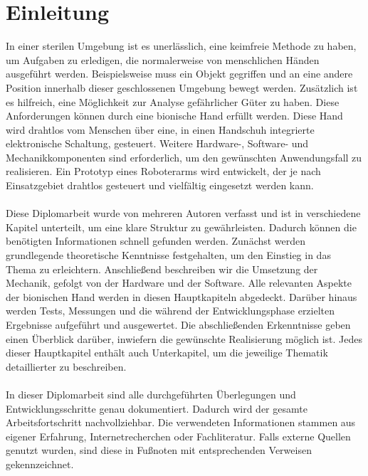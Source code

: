 \documentclass[titlepage,12pt,twoside]{article}
\begin{document}
\thispagestyle{empty}

\newpage


\tableofcontents


\clearpage
{}

\section{Einleitung}
\label{chap:Einleitung}
In einer sterilen Umgebung ist es unerlässlich, eine keimfreie Methode zu haben, um Aufgaben zu erledigen, die normalerweise von 
menschlichen Händen ausgeführt werden. Beispielsweise muss ein Objekt gegriffen und an eine andere Position innerhalb dieser 
geschlossenen Umgebung bewegt werden. Zusätzlich ist es hilfreich, eine Möglichkeit zur Analyse gefährlicher Güter zu haben.
Diese Anforderungen können durch eine bionische Hand erfüllt werden. Diese Hand wird drahtlos vom Menschen über eine, in einen 
Handschuh integrierte elektronische Schaltung, gesteuert. Weitere Hardware-, Software- und Mechanikkomponenten sind erforderlich, 
um den gewünschten Anwendungsfall zu realisieren. Ein Prototyp eines Roboterarms wird entwickelt, der je nach Einsatzgebiet 
drahtlos gesteuert und vielfältig eingesetzt werden kann. \\
\\
Diese Diplomarbeit wurde von mehreren Autoren verfasst und ist in verschiedene Kapitel unterteilt, um eine klare Struktur zu 
gewährleisten. Dadurch können die benötigten Informationen schnell gefunden werden. Zunächst werden grundlegende theoretische 
Kenntnisse festgehalten, um den Einstieg in das Thema zu erleichtern. Anschließend beschreiben wir die Umsetzung der Mechanik, 
gefolgt von der Hardware und der Software. Alle relevanten Aspekte der bionischen Hand werden in diesen Hauptkapiteln abgedeckt. 
Darüber hinaus werden Tests, Messungen und die während der Entwicklungsphase erzielten Ergebnisse aufgeführt und ausgewertet. Die 
abschließenden Erkenntnisse geben einen Überblick darüber, inwiefern die gewünschte Realisierung möglich ist. Jedes dieser 
Hauptkapitel enthält auch Unterkapitel, um die jeweilige Thematik detaillierter zu beschreiben. \\
\\
In dieser Diplomarbeit sind alle durchgeführten Überlegungen und Entwicklungsschritte genau dokumentiert. Dadurch wird der gesamte 
Arbeitsfortschritt nachvollziehbar. Die verwendeten Informationen stammen aus eigener Erfahrung, Internetrecherchen oder 
Fachliteratur. Falls externe Quellen genutzt wurden, sind diese in Fußnoten mit entsprechenden Verweisen gekennzeichnet. \\
\\
\end{document}
